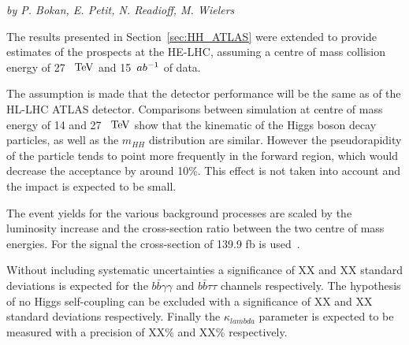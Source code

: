 \begin{center}
\textit{by P. Bokan, E. Petit, N. Readioff, M. Wielers}
\end{center}

The results presented in Section~\ref{sec:HH_ATLAS} were extended to provide estimates of the prospects at the HE-LHC, assuming a centre of mass collision energy of 27~$~\text{TeV}$ and 15~$ab^{-1}$ of data.

The assumption is made that the detector performance will be the same as of the HL-LHC ATLAS detector. Comparisons between simulation at centre of mass energy of 14 and 27~$~\text{TeV}$ show that the kinematic of the Higgs boson decay particles, as well as the $m_{HH}$ distribution are similar. However the pseudorapidity of the particle tends to point more frequently in the forward region, which would decrease the acceptance by around 10\%. This effect is not taken into account and the impact is expected to be small.

The event yields for the various background processes are scaled by the luminosity increase and the cross-section ratio between the two centre of mass energies. For the signal the cross-section of 139.9 fb is used~\cite{}.

Without including systematic uncertainties a significance of XX and XX standard deviations is expected for the $b\bar{b}\gamma\gamma$ and $b\bar{b}\tau\tau$ channels respectively.
The hypothesis of no Higgs self-coupling can be excluded with a significance of XX and XX standard deviations respectively. Finally the $\kappa_{lambda}$ parameter is expected to be measured with a precision of XX\% and XX\% respectively.